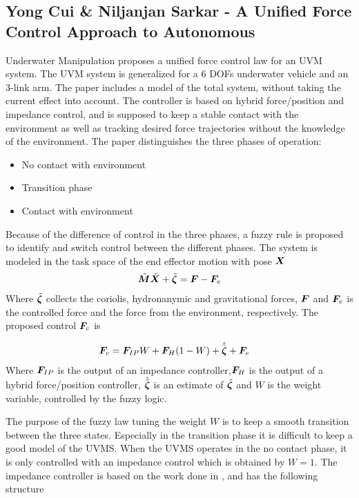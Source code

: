 \subsection{Yong Cui \& Niljanjan Sarkar - A Unified Force Control Approach to Autonomous}
Underwater Manipulation
\cite{unified_force_control} proposes a unified force control law for an UVM system. The UVM system is generalized for a 6 DOFs underwater vehicle and an 3-link arm. The paper includes a model of the total system, without taking the current effect into account. The controller is based on hybrid force/position and impedance control, and is supposed to keep a stable contact with the environment as well as tracking desired force trajectories without the knowledge of the environment. The paper distinguishes the three phases of operation: 


\begin{itemize}
  \item No contact with environment
  \item Transition phase
  \item Contact with environment
\end{itemize}
Because of the difference of control in the three phases, a fuzzy rule is proposed to identify and switch control between the different phases. The system is modeled in the task space of the end effector motion with pose $\boldsymbol X$
\begin{align}
  \tilde{\boldsymbol M}\ddot{\boldsymbol X}  + \tilde{\boldsymbol \zeta} = \boldsymbol F - \boldsymbol F_e
	\label{eq:unified_model} 
\end{align}
Where $\tilde{\boldsymbol \zeta}$ collects the coriolis, hydronanymic and gravitational forces, $\boldsymbol F$ and $\boldsymbol F_e$ is the controlled force and the force from the environment, respectively. The proposed control $\boldsymbol F_c $ is

\begin{align}
  \boldsymbol F_c &=\boldsymbol F_{IP}W + \boldsymbol F_H(1-W )+ \hat{\tilde{\boldsymbol \zeta}} + \boldsymbol F_e 
  \label{eq:unified_force}
\end{align}
Where $\boldsymbol F_{IP}$ is the output of an impedance controller,$\boldsymbol F_{H}$ is the output of a hybrid force/position controller, $\hat{\tilde{\boldsymbol \zeta}}$ is an estimate of $\tilde{\boldsymbol \zeta}$ and $W$ is the weight variable, controlled by the fuzzy logic.

The purpose of the fuzzy law tuning the weight $W$ is to keep a smooth transition between the three states. Especially in the transition phase it is difficult to keep a good model of the UVMS. When the UVMS operates in the no contact phase, it is only controlled with an impedance control which is obtained by $W=1$. The impedance controller is based on the work done in \cite{impedance_stability}, and has the following structure

